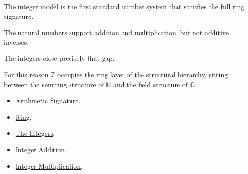 
\begin{remark*}

The integer model is the first standard number system that satisfies the full
ring signature.

The natural numbers support addition and multiplication, but not additive
inverses.

The integers close precisely that gap.

For this reason $\mathbb Z$ occupies the ring layer of the structural hierarchy,
sitting between the semiring structure of $\mathbb N$ and the field structure of
$\mathbb Q$.

\end{remark*}

\begin{dependencies}

\begin{itemize}
    \item \hyperref[def:arithmetic-signature]{Arithmetic Signature}.
    \item \hyperref[def:algebraic-ring]{Ring}.
    \item \hyperref[def:integers]{The Integers}.
    \item \hyperref[def:addition-on-z-classes]{Integer Addition}.
    \item \hyperref[def:multiplication-on-z-classes]{Integer Multiplication}.
\end{itemize}

\end{dependencies}
